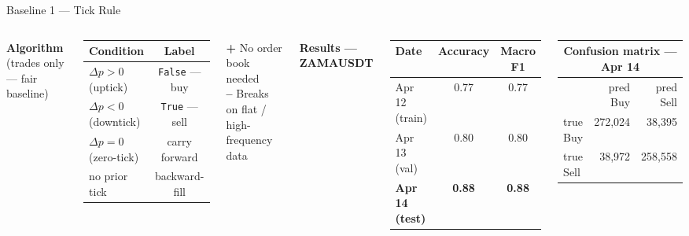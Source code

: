 \documentclass[aspectratio=169,10pt]{beamer}
\newcommand{\code}[1]{\texttt{\small #1}}
\begin{document}
\begin{frame}{Baseline 1 — Tick Rule}
  \begin{columns}[T]
    \textbf{Algorithm} \quad(trades only — fair baseline)

    \medskip
    \begin{center}
    \begin{tabular}{lc}
      \toprule
      Condition & Label \\
      \midrule
      $\Delta p > 0$ \;(uptick)  & \code{False} — buy \\
      $\Delta p < 0$ \;(downtick)& \code{True}  — sell \\
      $\Delta p = 0$ \;(zero-tick)& carry forward \\
      no prior tick & backward-fill \\
      \bottomrule
    \end{tabular}
    \end{center}

    \medskip
    \textcolor{okgreen}{\textbf{+}} No order book needed \\
    \textcolor{badred}{\textbf{--}} Breaks on flat / high-frequency data

    \textbf{Results — ZAMAUSDT}

    \medskip
    \begin{center}
    \begin{tabular}{lcc}
      \toprule
      Date & Accuracy & Macro F1 \\
      \midrule
      Apr 12 (train) & 0.77 & 0.77 \\
      Apr 13 (val)   & 0.80 & 0.80 \\
      \textbf{Apr 14 (test)} & \textbf{0.88} & \textbf{0.88} \\
      \bottomrule
    \end{tabular}
    \end{center}

    \medskip
    \begin{center}
    \begin{tabular}{lrr}
      \multicolumn{3}{c}{\small Confusion matrix — Apr 14}\\
      \toprule
       & pred Buy & pred Sell \\
      \midrule
      true Buy  & 272{,}024 & 38{,}395 \\
      true Sell & 38{,}972  & 258{,}558 \\
      \bottomrule
    \end{tabular}
    \end{center}
  \end{columns}
\end{frame}
\end{document}
